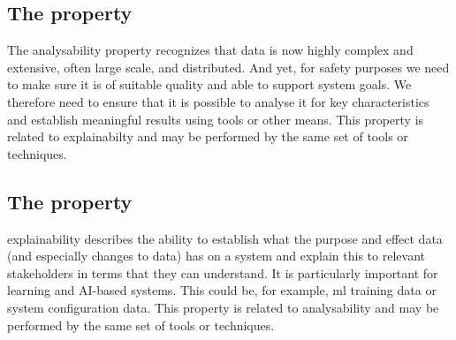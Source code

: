 %
\subsection{The  property}\label{bkm:guidance:analysability}
The \gls{analysability} property recognizes that data is now highly complex and extensive, often large scale, and distributed. And yet, for safety purposes we need to make sure it is of suitable quality and able to support system goals.
We therefore need to ensure that it is possible to analyse it for key characteristics and establish meaningful results using tools or other means. This property is related to explainabilty and may be performed by the same set of tools or techniques.

\subsection{The  property}\label{bkm:guidance:explainability}
\Gls{explainability} describes the ability to establish what the purpose and effect data (and especially changes to data) has on a system
and explain this to relevant \glspl{stakeholder} in terms that they can understand. It is particularly important for learning and AI-based systems.
This could be, for example, \gls{ml} training data or system \gls{configuration data}.
This property is related to \gls{analysability} and may be performed by the same set of tools or techniques.
%
